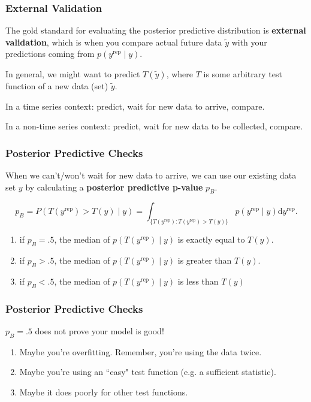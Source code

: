 \documentclass{beamer}
\begin{document}
\begin{frame}
\frametitle{External Validation}

The gold standard for evaluating the posterior predictive distribution is {\bf external validation}, which is when you compare actual future data $\tilde{y}$ with your predictions coming from $p(y^{\text{rep}} \mid y)$.
\newline

In general, we might want to predict $T(\tilde{y})$, where $T$ is some arbitrary test function of a new data (set) $\tilde{y}$.
\newline

In a time series context: predict, wait for new data to arrive, compare.
\newline

In a non-time series context: predict, wait for new data to be collected, compare.

\end{frame}

\begin{frame}
\frametitle{Posterior Predictive Checks}

When we can't/won't wait for new data to arrive, we can use our existing data set $y$ by calculating a {\bf posterior predictive p-value} $p_B$. 
\newline

\[
p_B = P(T(y^{\text{rep}}) > T(y) \mid y) = \int_{\{T(y^{\text{rep}}) : T(y^{\text{rep}}) > T(y) \}} p(y^{\text{rep}} \mid y) \text{d}y^{\text{rep}}. 
\]

\begin{enumerate}
\item if $p_B = .5$, the median of $p(T(y^{\text{rep}}) \mid y)$ is exactly equal to $T(y)$.
\item if $p_B > .5$, the median of $p(T(y^{\text{rep}}) \mid y)$ is greater than  $T(y)$.
\item if $p_B < .5$, the median of $p(T(y^{\text{rep}}) \mid y)$ is less than  $T(y)$
\end{enumerate}



\end{frame}




\begin{frame}
\frametitle{Posterior Predictive Checks}

$p_B = .5$ does not \*prove\* your model is good! 
\begin{enumerate}
\item Maybe you're overfitting. Remember, you're using the data twice.
\item Maybe you're using an ``easy" test function (e.g. a sufficient statistic).
\item Maybe it does poorly for other test functions.
\end{enumerate}

\end{frame}
\end{document}
